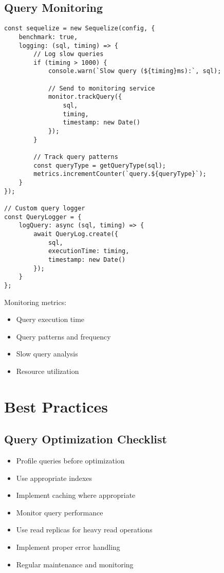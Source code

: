 \documentclass[12pt,a4paper]{book}
\begin{document}
	\subsection{Query Monitoring}
	\begin{tcolorbox}[title=Implementing Query Monitoring]
		\begin{verbatim}
const sequelize = new Sequelize(config, {
	benchmark: true,
	logging: (sql, timing) => {
		// Log slow queries
		if (timing > 1000) {
			console.warn(`Slow query (${timing}ms):`, sql);
			
			// Send to monitoring service
			monitor.trackQuery({
				sql,
				timing,
				timestamp: new Date()
			});
		}
		
		// Track query patterns
		const queryType = getQueryType(sql);
		metrics.incrementCounter(`query.${queryType}`);
	}
});

// Custom query logger
const QueryLogger = {
	logQuery: async (sql, timing) => {
		await QueryLog.create({
			sql,
			executionTime: timing,
			timestamp: new Date()
		});
	}
};
		\end{verbatim}
		
		Monitoring metrics:
		\begin{itemize}
			\item Query execution time
			\item Query patterns and frequency
			\item Slow query analysis
			\item Resource utilization
		\end{itemize}
	\end{tcolorbox}
	
	\section{Best Practices}
	
	\subsection{Query Optimization Checklist}
	\begin{itemize}
		\item Profile queries before optimization
		\item Use appropriate indexes
		\item Implement caching where appropriate
		\item Monitor query performance
		\item Use read replicas for heavy read operations
		\item Implement proper error handling
		\item Regular maintenance and monitoring
	\end{itemize}
	
\end{document}

